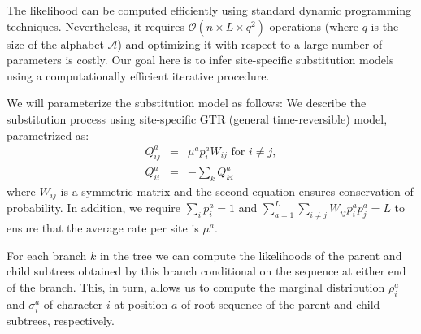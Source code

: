 \documentclass[aps,rmp, onecolumn]{revtex4}
\newcommand{\abet}{\mathcal{A}}
\newcommand{\eqp}{p}
\begin{document}
The likelihood can be computed efficiently using standard dynamic programming techniques.
Nevertheless, it requires $\mathcal{O}(n\times L \times q^2)$ operations (where $q$ is the size of the alphabet $\abet$) and optimizing it with respect to a large number of parameters is costly.
Our goal here is to infer site-specific substitution models using a computationally efficient iterative procedure.

We will parameterize the substitution model as follows:
We describe the substitution process using site-specific GTR
(general time-reversible) model, parametrized as:
\begin{eqnarray}
Q^{a}_{ij} &=& \mu^{a}\eqp^{a}_{i} W_{ij} \textrm{ for } i\neq j,\nonumber \\
Q^{a}_{ii} &=& -\sum_k Q^{a}_{ki}
\label{eq:Qij}
\end{eqnarray}
where $W_{ij}$ is a symmetric matrix and the second equation ensures conservation of probability.
In addition, we require $\sum_i \eqp^{a}_i = 1$ and $\sum_{a=1}^L\sum_{i\neq j}W_{ij}p^{a}_ip^{a}_j=L$ to ensure that the average rate per site is $\mu^{a}$.

For each branch $k$ in the tree we can compute the likelihoods of the parent and child subtrees obtained by this branch conditional on the sequence at either end of the branch.
This, in turn, allows us to compute the marginal distribution $\rho^{a}_i$ and $\sigma^{a}_i$ of character $i$ at position $a$ of root sequence of the parent and child subtrees, respectively.
\end{document}
